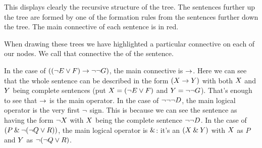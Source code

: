 This displays clearly the recursive structure of the tree. The sentences further up the tree are formed by one of the formation rules from the sentences further down the tree. The main connective of each sentence is in red. 


%
%
%
%


When drawing these trees we have highlighted a particular connective on each of our nodes. We call that connective the  of the sentence.


 In the case of $((\neg E \vee F) \rightarrow \neg\neg G)$, the main connective is $\rightarrow$. Here we can see that the whole sentence can be described in the form $(X\rightarrow Y)$ with both $X$ and $Y$ being complete sentences (put $X=(\neg E\vee F)$ and $Y=\neg\neg G$). That's enough to see that $\rightarrow$ is the main operator. 
 In the case of $\neg\neg\neg D$, the main logical operator is the very first $\neg$ sign. This is because we can see the sentence as having the form $\neg X$ with $X$ being the complete sentence $\neg\neg D$. In the case of $(P \mathbin{\&} \neg (\neg Q \vee R))$, the main logical operator is $\mathbin{\&}$: it's an $(X\mathbin{\&}Y)$ with $X$ as $P$ and $Y$ as $\neg (\neg Q \vee R)$. 

